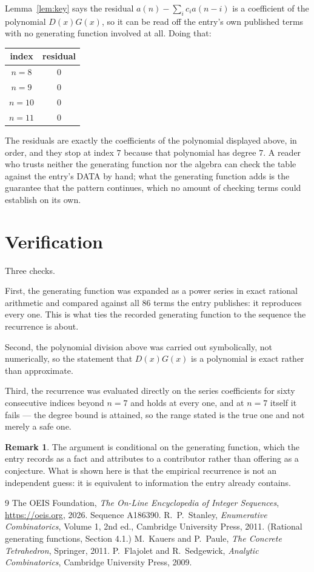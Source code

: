 \documentclass[11pt,a4paper]{article}
\theoremstyle{plain}
\theoremstyle{definition}
\newtheorem{remark}[theorem]{Remark}
\begin{document}
Lemma~\ref{lem:key} says the residual $a(n)-\sum_ic_ia(n-i)$ is a coefficient of the
polynomial $D(x)G(x)$, so it can be read off the entry's own published terms with no
generating function involved at all. Doing that:
\begin{center}
\begin{tabular}{cc}
index & residual \\ \hline
$n=8$ & $0$ \\
$n=9$ & $0$ \\
$n=10$ & $0$ \\
$n=11$ & $0$
\end{tabular}
\end{center}
The residuals are exactly the coefficients of the polynomial displayed above, in order, and
they stop at index $7$ because that polynomial has degree $7$. A reader who trusts
neither the generating function nor the algebra can check the table against the entry's DATA
by hand; what the generating function adds is the guarantee that the pattern continues, which
no amount of checking terms could establish on its own.

\section{Verification}

Three checks.

First, the generating function was expanded as a power series in exact rational arithmetic and
compared against all $86$ terms the entry publishes: it reproduces every one. This is
what ties the recorded generating function to the sequence the recurrence is about.

Second, the polynomial division above was carried out symbolically, not numerically, so the
statement that $D(x)G(x)$ is a polynomial is exact rather than approximate.

Third, the recurrence was evaluated directly on the series coefficients for sixty consecutive
indices beyond $n=7$ and holds at every one, and at $n=7$ itself it fails --- the
degree bound is attained, so the range stated is the true one and not merely a safe one.

\begin{remark}
The argument is conditional on the generating function, which the entry records as a fact and
attributes to a contributor rather than offering as a conjecture. What is shown here is that
the empirical recurrence is not an independent guess: it is equivalent to information the
entry already contains.
\end{remark}

\begin{thebibliography}{9}
 The OEIS Foundation, \emph{The On-Line Encyclopedia of Integer
Sequences}, \url{https://oeis.org}, 2026. Sequence A186390.
 R.~P.~Stanley, \emph{Enumerative Combinatorics}, Volume 1, 2nd ed.,
Cambridge University Press, 2011. (Rational generating functions, Section 4.1.)
 M.~Kauers and P.~Paule, \emph{The Concrete Tetrahedron}, Springer, 2011.
 P.~Flajolet and R.~Sedgewick, \emph{Analytic Combinatorics}, Cambridge
University Press, 2009.
\end{thebibliography}
\end{document}

